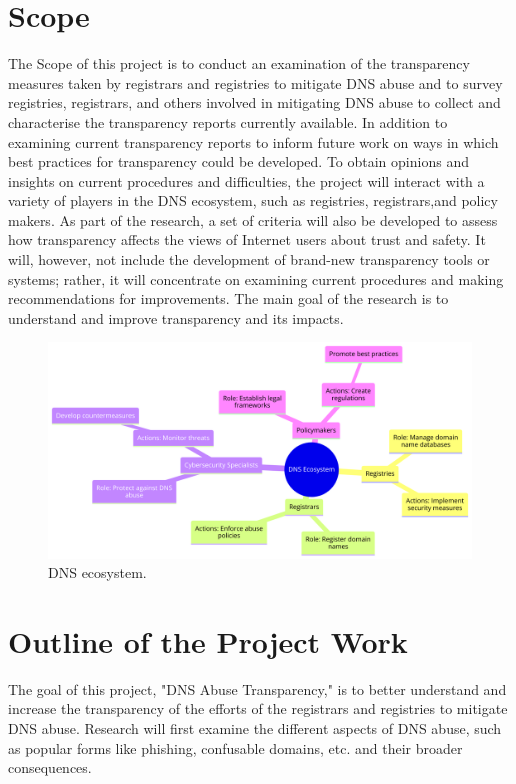 \section{Scope}	
The Scope of this project is to conduct an examination of the transparency measures taken by registrars and registries to mitigate DNS abuse and to survey registries, registrars, and others involved in mitigating DNS abuse to collect and characterise the transparency reports currently available. In addition to examining current transparency reports to inform future work on ways in which best practices for transparency could be developed. To obtain opinions and insights on current procedures and difficulties, the project will interact with a variety of players in the DNS ecosystem, such as registries, registrars,and policy makers. As part of the research, a set of criteria will also be developed to assess how transparency affects the views of Internet users about trust and safety. It will, however, not include the development of brand-new transparency tools or systems; rather, it will concentrate on examining current procedures and making recommendations for improvements. The main goal of the research is to understand and improve transparency and its impacts. 

\begin{figure}[H]
    \centering
    \includegraphics[width=\linewidth]{introduction/diagram (8).png}
    \caption{ DNS ecosystem.}
    \label{fig:dnsintrointro}
\end{figure}

\section{ Outline of the Project Work} 
The goal of this project, "DNS Abuse Transparency," is to better understand and increase the transparency of the efforts of the registrars and registries to mitigate DNS abuse. Research will first examine the different aspects of DNS abuse, such as popular forms like phishing, confusable domains, etc. and their broader consequences. 

